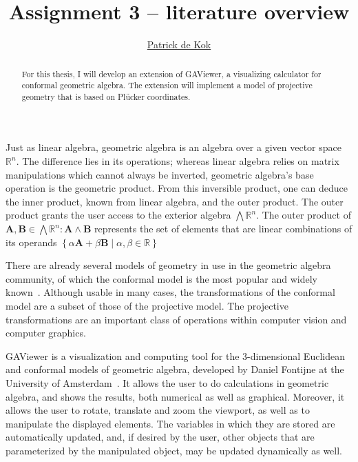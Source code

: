 \documentclass[a4paper,11pt,twoside]{article}
\title{Assignment 3 -- literature overview}
\author{\href{mailto:pkok@science.uva.nl}{Patrick de Kok}}
\newcommand{\V}[1]{\ensuremath{\mathbf{#1}}}
\newcommand{\reals}{\ensuremath{\mathbb{R}}}
\begin{document}
\maketitle
\begin{abstract}
For this thesis, I will develop an extension of GAViewer, a visualizing calculator for conformal geometric algebra.  The extension will implement a model of projective geometry that is based on Pl\"ucker coordinates.
\end{abstract}

Just as linear algebra, geometric algebra is an algebra over a given vector space $\reals^n$.  The difference lies in its operations; whereas linear algebra relies on matrix manipulations which cannot always be inverted, geometric algebra's base operation is the geometric product.  From this inversible product, one can deduce the inner product, known from linear algebra, and the outer product.  The outer product grants the user access to the exterior algebra $\bigwedge \reals^n$.  The outer product of $\V{A}, \V{B} \in \bigwedge \reals^n: \V{A} \wedge \V{B}$ represents the set of elements that are linear combinations of its operands $\left\{\alpha \V{A} + \beta \V{B} \mid \alpha, \beta \in \reals \right\}$

There are already several models of geometry in use in the geometric algebra community, of which the conformal model is the most popular and widely known~\cite{TheBook}.  Although usable in many cases, the transformations of the conformal model are a subset of those of the projective model. The projective transformations are an important class of operations within computer vision and computer graphics. 

GAViewer is a visualization and computing tool for the 3-dimensional Euclidean and conformal models of geometric algebra, developed by Daniel Fontijne at the University of Amsterdam~\cite{GAViewer}.  It allows the user to do calculations in geometric algebra, and shows the results, both numerical as well as graphical.  Moreover, it allows the user to rotate, translate and zoom the viewport, as well as to manipulate the displayed elements.  The variables in which they are stored are automatically updated, and, if desired by the user, other objects that are parameterized by the manipulated object, may be updated dynamically as well.
\end{document}
